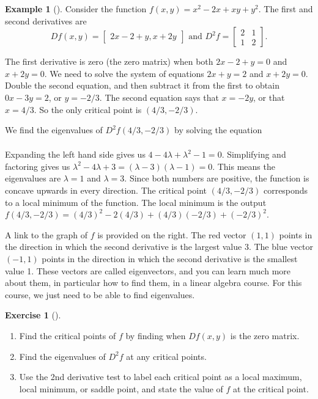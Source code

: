 \documentclass[10pt,]{book}
\theoremstyle{plain}
\theoremstyle{definition}
\theoremstyle{definition}
\theoremstyle{definition}
\newtheorem{example}[theorem]{Example}
\theoremstyle{definition}
\newtheorem{exploration}[project]{Exercise}
\theoremstyle{definition}
\numberwithin{equation}{section}
\newcommand{\amp}{&}
\begin{document}
\begin{example}[]\label{example-2}
Consider the function \(f(x,y)=x^2-2x+xy+y^2\). The first and second derivatives are%
\begin{equation*}
Df(x,y)=\begin{bmatrix}2x-2+y,x+2y
\end{bmatrix} 
\text{ and }  
D^2f = \begin{bmatrix}2\amp 1 \\1\amp 2
\end{bmatrix} .
\end{equation*}
%
\par
The first derivative is zero (the zero matrix) when both \(2x-2+y=0\) and \(x+2y=0\). We need to solve the system of equations \(2x+y=2\) and \(x+2y=0\). Double the second equation, and then subtract it from the first to obtain \(0x-3y=2\), or \(y=-2/3\). The second equation says that \(x=-2y\), or that \(x=4/3\). So the only critical point is \((4/3,-2/3)\).%
\par
We find the eigenvalues of \(D^2 f(4/3,-2/3)\) by solving the equation%
\begin{align*}

\end{align*}
%
\par
Expanding the left hand side gives us {\(4-4\lambda + \lambda^2 -1 = 0\)}. Simplifying and factoring gives us \(\lambda^2-4\lambda +3 = (\lambda-3)(\lambda -1) = 0\). This means the eigenvalues are \(\lambda = 1\) and \(\lambda=3\). Since both numbers are positive, the function is concave upwards in every direction. The critical point \((4/3,-2/3)\) corresponds to a local minimum of the function. The local minimum is the output \(f(4/3,-2/3) = (4/3)^2-2(4/3)+(4/3)(-2/3)+(-2/3)^2\).%
\par
A link to the graph of \(f\) is provided on the right. The red vector \((1,1)\) points in the direction in which the second derivative is the largest value 3. The blue vector \((-1,1)\) points in the direction in which the second derivative is the smallest value 1. These vectors are called eigenvectors, and you can learn much more about them, in particular how to find them, in a linear algebra course. For this course, we just need to be able to find eigenvalues.%
\end{example}
\begin{exploration}[]\label{exploration-235}
\leavevmode%
\begin{enumerate}[font=\bfseries,label=(\alph*),ref=\alph*]
\item\label{task-630} Find the critical points of \(f\) by finding when \(Df(x,y)\) is the zero matrix.%
\item\label{task-631} Find the eigenvalues of \(D^2f\) at any critical points.%
\item\label{task-632} Use the 2nd derivative test to label each critical point as a local maximum, local minimum, or saddle point, and state the value of \(f\) at the critical point.%
\end{enumerate}
\end{exploration}
\end{document}
